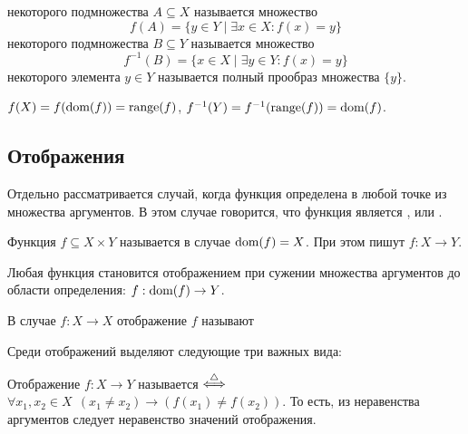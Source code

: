 \begin{definition}
     некоторого подмножества $ A \subseteq X $ называется множество
    \[
        f(A) = \{ y \in Y \mid \exists x \in X: f(x) = y \}
    \]
     некоторого подмножества $ B \subseteq Y $ называется множество
    \[
        f^{-1}(B) = \{ x \in X \mid \exists y \in Y: f(x) = y \}
    \]
     некоторого элемента $ y \in Y $ называется полный прообраз множества $ \{ y \} $.
\end{definition}

\begin{remark}
    $ f(X) = f(\operatorname*{\textnormal{dom}}(f)) = \operatorname*{\textnormal{range}}(f) $, $ f^{-1}(Y) = f^{-1}(\operatorname*{\textnormal{range}}(f)) = \operatorname*{\textnormal{dom}}(f) $.
\end{remark}


\subsection{Отображения}
\label{subsec:functions:mappings}

Отдельно рассматривается случай, когда функция определена в любой точке из множества аргументов.
В этом случае говорится, что функция является , или .

\begin{definition}
    Функция $ f \subseteq X \times Y $ называется  в случае $ \operatorname*{\textnormal{dom}}(f) = X $.
    При этом пишут $ f: X \to Y $.
\end{definition}

\begin{remark}
    Любая функция становится отображением при сужении множества аргументов до области определения: $ f: \operatorname*{\textnormal{dom}}(f) \to Y $.
\end{remark}

\begin{definition}
    В случае $ f: X \to X $ отображение $ f $ называют 
\end{definition}

Среди отображений выделяют следующие три важных вида:

\begin{definition}
    Отображение $ f: X \to Y $ называется  $ \overset{\triangle}{\Longleftrightarrow} $ $ \forall x_1, x_2 \in X \;\, (x_1 \neq x_2) \rightarrow (f(x_1) \neq f(x_2)) $.
    То есть, из неравенства аргументов следует неравенство значений отображения.
\end{definition}

